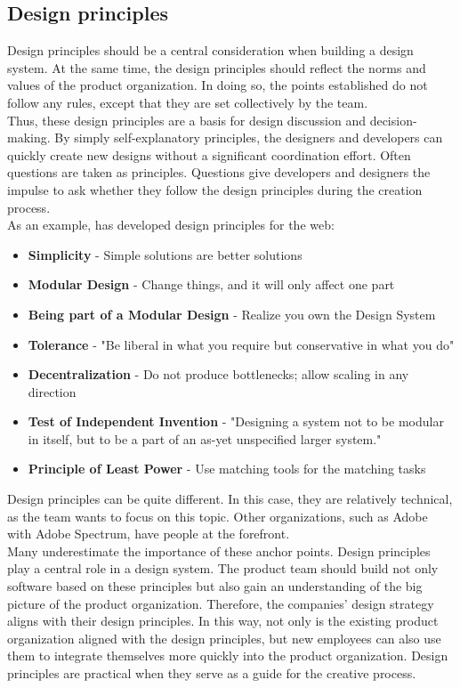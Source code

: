 \subsection{Design principles}\label{design_principles}
Design principles should be a central consideration when building a design system. At the same time, the design principles should reflect the norms and values of the product organization. In doing so, the points established do not follow any rules, except that they are set collectively by the team. \\
Thus, these design principles are a basis for design discussion and decision-making. By simply self-explanatory principles, the designers and developers can quickly create new designs without a significant coordination effort. Often questions are taken as principles. Questions give developers and designers the impulse to ask whether they follow the design principles during the creation process. \cite{brignell_design_2022} \\
As an example, \citet{berners-lee_principles_2013} has developed design principles for the web: 
\begin{itemize}
\item \textbf{Simplicity} - Simple solutions are better solutions
\item \textbf{Modular Design} - Change things, and it will only affect one part
\item \textbf{Being part of a Modular Design} - Realize you own the Design System
\item \textbf{Tolerance} - "Be liberal in what you require but conservative in what you do"
\item \textbf{Decentralization} - Do not produce bottlenecks; allow scaling in any direction
\item \textbf{Test of Independent Invention} - "Designing a system not to be modular in itself, but to be a part of an as-yet unspecified larger system."
\item \textbf{Principle of Least Power} - Use matching tools for the matching tasks
\end{itemize}
Design principles can be quite different. In this case, they are relatively technical, as the team wants to focus on this topic. Other organizations, such as Adobe with Adobe Spectrum, have people at the forefront. \cite{spectrum_adobe_spectrum_nodate} \\
Many underestimate the importance of these anchor points. Design principles play a central role in a design system.  The product team should build not only software based on these principles but also gain an understanding of the big picture of the product organization.  Therefore, the companies' design strategy aligns with their design principles. In this way, not only is the existing product organization aligned with the design principles, but new employees can also use them to integrate themselves more quickly into the product organization. Design principles are practical when they serve as a guide for the creative process.\cite{vesselov_building_2019} \\
